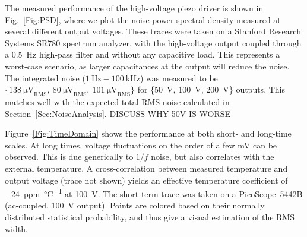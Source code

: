 \documentclass[aip,rsi,reprint]{revtex4-1} %
\begin{document}
The measured performance of the high-voltage piezo driver is shown in Fig.~\ref{Fig:PSD}, where we plot the noise power spectral density measured at several different output voltages.
These traces were taken on a Stanford Research Systems SR780 spectrum analyzer, with the high-voltage output coupled through a \SI{0.5}{\hertz} high-pass filter and without any capacitive load.
This represents a worst-case scenario, as larger capacitances at the output will reduce the noise.
The integrated noise ($\SI{1}{\hertz} - \SI{100}{\kilo\hertz}$) was measured to be $\{\SI{138}{\micro\volt}_\text{RMS},~\SI{80}{\micro\volt}_\text{RMS},~\SI{101}{\micro\volt}_\text{RMS}\}$ for \{\SI{50}{\volt}, \SI{100}{\volt}, \SI{200}{\volt}\} outputs. 
This matches well with the expected total RMS noise calculated in Section~\ref{Sec:NoiseAnalysis}.
DISCUSS WHY 50V IS WORSE

Figure~\ref{Fig:TimeDomain} shows the performance at both short- and long-time scales.
At long times, voltage fluctuations on the order of a few \si{\milli\volt} can be observed.
This is due generically to $1/f$ noise, but also correlates with the external temperature.
A cross-correlation between measured temperature and output voltage (trace not shown) yields an effective temperature coefficient of \SI[per-mode=symbol]{-24}{ppm\per\celsius} at \SI{100}{\volt}.
The short-term trace was taken on a PicoScope~5442B (ac-coupled, \SI{100}{\volt} output).
Points are colored based on their normally distributed statistical probability, and thus give a visual estimation of the RMS width.
\end{document}
